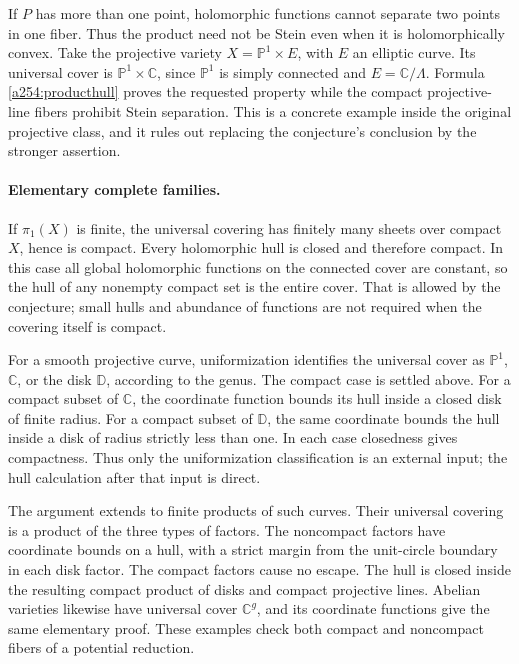 \documentclass[11pt]{article}
\begin{document}
If $P$ has more than one point, holomorphic functions cannot separate
two points in one fiber. Thus the product need not be Stein even when
it is holomorphically convex. Take the projective variety
$X=\mathbb P^1\times E$, with $E$ an elliptic curve. Its universal
cover is $\mathbb P^1\times\mathbb C$, since $\mathbb P^1$ is
simply connected and $E=\mathbb C/\Lambda$. Formula
\eqref{a254:producthull} proves the requested property while the
compact projective-line fibers prohibit Stein separation. This is a
concrete example inside the original projective class, and it rules
out replacing the conjecture's conclusion by the stronger assertion.

\paragraph{Elementary complete families.}
If $\pi_1(X)$ is finite, the universal covering has finitely many
sheets over compact $X$, hence is compact. Every holomorphic hull is
closed and therefore compact. In this case all global holomorphic
functions on the connected cover are constant, so the hull of any
nonempty compact set is the entire cover. That is allowed by the
conjecture; small hulls and abundance of functions are not required
when the covering itself is compact.

For a smooth projective curve, uniformization identifies the universal
cover as $\mathbb P^1$, $\mathbb C$, or the disk $\mathbb D$, according
to the genus. The compact case is settled above. For a compact subset
of $\mathbb C$, the coordinate function bounds its hull inside a
closed disk of finite radius. For a compact subset of $\mathbb D$,
the same coordinate bounds the hull inside a disk of radius strictly
less than one. In each case closedness gives compactness. Thus only
the uniformization classification is an external input; the hull
calculation after that input is direct.

The argument extends to finite products of such curves. Their
universal covering is a product of the three types of factors. The
noncompact factors have coordinate bounds on a hull, with a strict
margin from the unit-circle boundary in each disk factor. The compact
factors cause no escape. The hull is closed inside the resulting
compact product of disks and compact projective lines. Abelian
varieties likewise have universal cover $\mathbb C^g$, and its
coordinate functions give the same elementary proof. These examples
check both compact and noncompact fibers of a potential reduction.
\end{document}
